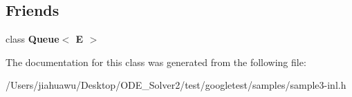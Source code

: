 \subsection*{Friends}
\begin{DoxyCompactItemize}
\item 
\mbox{\label{class_queue_node_ad4336229b1d7c3626e4ba69f236b202d}} 
class {\bfseries Queue$<$ E $>$}
\end{DoxyCompactItemize}


The documentation for this class was generated from the following file\+:\begin{DoxyCompactItemize}
\item 
/\+Users/jiahuawu/\+Desktop/\+O\+D\+E\+\_\+\+Solver2/test/googletest/samples/sample3-\/inl.\+h\end{DoxyCompactItemize}
